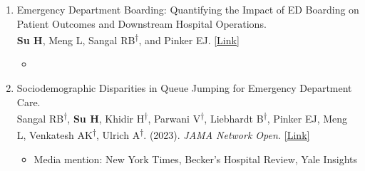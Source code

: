 \documentclass[letterpaper,11pt]{article}
\newif\ifpublic
\newcommand{\PrivatePaperStatusBoarding}{Working Paper}
\newcommand{\PublicPaperStatusBoarding}{Working Paper}
\newcommand{\PaperStatusBoarding}{\ifpublic\PublicPaperStatusBoarding\else\PrivatePaperStatusBoarding\fi}
\begin{document}
\begin{enumerate}[leftmargin=*]
    \vspace{-8pt}
    \item Emergency Department Boarding: Quantifying the Impact of ED Boarding on Patient Outcomes and Downstream Hospital Operations.\\\textbf{Su H}, Meng L, Sangal RB\textsuperscript{†}, and Pinker EJ. \href{https://papers.ssrn.com/sol3/papers.cfm?abstract_id=4693153}{\textcolor{linkblue}{[Link]}}
    \vspace{-8pt}
    \begin{itemize}
        \item \PaperStatusBoarding
    \end{itemize}

    \vspace{-8pt}
    \item Sociodemographic Disparities in Queue Jumping for Emergency Department Care. \\Sangal RB\textsuperscript{†}, \textbf{Su H}, Khidir H\textsuperscript{†}, Parwani V\textsuperscript{†}, Liebhardt B\textsuperscript{†}, Pinker EJ, Meng L, Venkatesh AK\textsuperscript{†}, Ulrich A\textsuperscript{†}. (2023). \textit{JAMA Network Open.} \href{https://jamanetwork.com/journals/jamanetworkopen/fullarticle/2807707}{\textcolor{linkblue}{[Link]}}
    \vspace{-8pt}
    \begin{itemize}
        \item Media mention: New York Times, Becker's Hospital Review, Yale Insights
    \end{itemize}

\end{enumerate}


\end{document}
